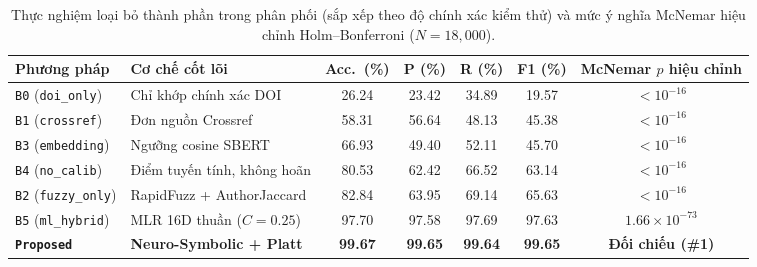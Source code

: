 {\setlength{\tabcolsep}{3.5pt}
\begin{table}[!htbp]
\centering
\caption{Thực nghiệm loại bỏ thành phần trong phân phối (sắp xếp theo độ chính xác kiểm thử) và mức ý nghĩa McNemar hiệu chỉnh Holm--Bonferroni ($N = 18{,}000$).}\label{tab:baselines}
\begin{tabular}{|L{0.23}|L{0.25}|C{0.09}|C{0.09}|C{0.09}|C{0.09}|C{0.16}|}
\hline
\textbf{Phương pháp} & \textbf{Cơ chế cốt lõi} & \textbf{Acc.\ (\%)} & \textbf{P (\%)} & \textbf{R (\%)} & \textbf{F1 (\%)} & \textbf{McNemar $p$ hiệu chỉnh} \\
\hline
\texttt{B0} (\texttt{doi\_only}) & Chỉ khớp chính xác DOI & 26.24 & 23.42 & 34.89 & 19.57 & $< 10^{-16}$ \\
\hline
\texttt{B1} (\texttt{crossref}) & Đơn nguồn Crossref & 58.31 & 56.64 & 48.13 & 45.38 & $< 10^{-16}$ \\
\hline
\texttt{B3} (\texttt{embedding}) & Ngưỡng cosine SBERT & 66.93 & 49.40 & 52.11 & 45.70 & $< 10^{-16}$ \\
\hline
\texttt{B4} (\texttt{no\_calib}) & Điểm tuyến tính, không hoãn & 80.53 & 62.42 & 66.52 & 63.14 & $< 10^{-16}$ \\
\hline
\texttt{B2} (\texttt{fuzzy\_only}) & RapidFuzz + AuthorJaccard & 82.84 & 63.95 & 69.14 & 65.63 & $< 10^{-16}$ \\
\hline
\texttt{B5} (\texttt{ml\_hybrid}) & MLR 16D thuần ($C = 0.25$) & 97.70 & 97.58 & 97.69 & 97.63 & $1.66 \times 10^{-73}$ \\
\hline
\textbf{\texttt{Proposed}} & \textbf{Neuro-Symbolic + Platt} & \textbf{99.67} & \textbf{99.65} & \textbf{99.64} & \textbf{99.65} & \textbf{Đối chiếu (\#1)} \\
\hline
\end{tabular}
\end{table}
}

